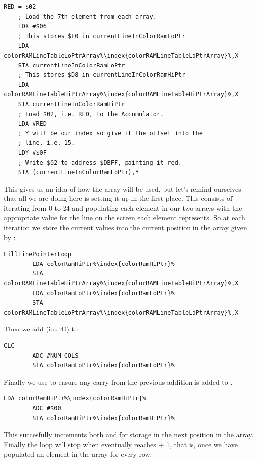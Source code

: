 \begin{lstlisting}[basicstyle=\ttfamily\scriptsize,escapechar=\%]
    RED = $02
    ; Load the 7th element from each array.
    LDX #$06
    ; This stores $F0 in currentLineInColorRamLoPtr
    LDA colorRAMLineTableLoPtrArray%\index{colorRAMLineTableLoPtrArray}%,X
    STA currentLineInColorRamLoPtr
    ; This stores $D8 in currentLineInColorRamHiPtr
    LDA colorRAMLineTableHiPtrArray%\index{colorRAMLineTableHiPtrArray}%,X
    STA currentLineInColorRamHiPtr
    ; Load $02, i.e. RED, to the Accumulator. 
    LDA #RED
    ; Y will be our index so give it the offset into the
    ; line, i.e. 15. 
    LDY #$0F
    ; Write $02 to address $DBFF, painting it red.
    STA (currentLineInColorRamLoPtr),Y
\end{lstlisting}

This gives us an idea of how the array will be used, but let's remind ourselves that all we are doing here is setting
it up in the first place. This consists of iterating from 0 to 24 and populating each element in our two arrays with
the appropriate value for the line on the screen each element represents. So at each iteration we store
the current values into the current position in the array given by :

\begin{lstlisting}[escapechar=\%]
FillLinePointerLoop
        LDA colorRamHiPtr%\index{colorRamHiPtr}%
        STA colorRAMLineTableHiPtrArray%\index{colorRAMLineTableHiPtrArray}%,X
        LDA colorRamLoPtr%\index{colorRamLoPtr}%
        STA colorRAMLineTableLoPtrArray%\index{colorRAMLineTableLoPtrArray}%,X
\end{lstlisting}

Then we add   (i.e. 40) to : 

\begin{lstlisting}[escapechar=\%]
        CLC 
        ADC #NUM_COLS
        STA colorRamLoPtr%\index{colorRamLoPtr}%
\end{lstlisting}

Finally we use  to ensure any carry from the previous addition is added to . 

\begin{lstlisting}[escapechar=\%]
        LDA colorRamHiPtr%\index{colorRamHiPtr}%
        ADC #$00
        STA colorRamHiPtr%\index{colorRamHiPtr}%
\end{lstlisting}

This succesfully increments both  and  for storage in the next position in
the array. Finally the loop will stop when  eventually reaches  + 1, that is, once we have
populated an element in the array for every row:

